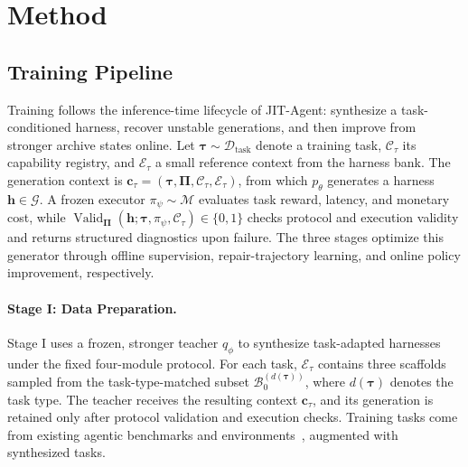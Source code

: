\documentclass{article}
\newcommand{\ourmethod}{JIT-Agent\xspace}
\begin{document}
\vspace{-0.5em}
\section{Method}\label{sec:method}
\vspace{-0.5em}
\subsection{Training Pipeline}\label{sec:training}
\vspace{-0.5em}

Training follows the inference-time lifecycle of \ourmethod: synthesize a task-conditioned harness, recover unstable generations, and then improve from stronger archive states online. Let $\boldsymbol{\tau}\sim\mathcal{D}_{\mathrm{task}}$ denote a training task, $\mathcal{C}_{\tau}$ its capability registry, and $\mathcal{E}_{\tau}$ a small reference context from the harness bank. The generation context is $\mathbf{c}_{\tau}=(\boldsymbol{\tau},\boldsymbol{\Pi},\mathcal{C}_{\tau},\mathcal{E}_{\tau})$, from which $p_{\theta}$ generates a harness $\mathbf{h}\in\mathcal{G}$. A frozen executor $\pi_{\psi}\sim\mathcal{M}$ evaluates task reward, latency, and monetary cost, while $\operatorname{Valid}_{\boldsymbol{\Pi}}(\mathbf{h};\boldsymbol{\tau},\pi_{\psi},\mathcal{C}_{\tau})\in\{0,1\}$ checks protocol and execution validity and returns structured diagnostics upon failure. The three stages optimize this generator through offline supervision, repair-trajectory learning, and online policy improvement, respectively.

\vspace{-0.5em}
\paragraph{Stage I: Data Preparation.}\label{sec:scaffold_synthesis}
Stage I uses a frozen, stronger teacher $q_{\phi}$ to synthesize task-adapted harnesses under the fixed four-module protocol. For each task, $\mathcal{E}_{\tau}$ contains three scaffolds sampled from the task-type-matched subset $\mathcal{B}_0^{(d(\boldsymbol{\tau}))}$, where $d(\boldsymbol{\tau})$ denotes the task type. The teacher receives the resulting context $\mathbf{c}_{\tau}$, and its generation is retained only after protocol validation and execution checks. Training tasks come from existing agentic benchmarks and environments~\citep{wu2025webwalkerbenchmarkingllmsweb,shi2025taskcraftautomatedgenerationagentic,bai2026clawgymscalableframeworkbuilding,song2026envscalerscalingtoolinteractiveenvironments}, augmented with synthesized tasks.
\end{document}
